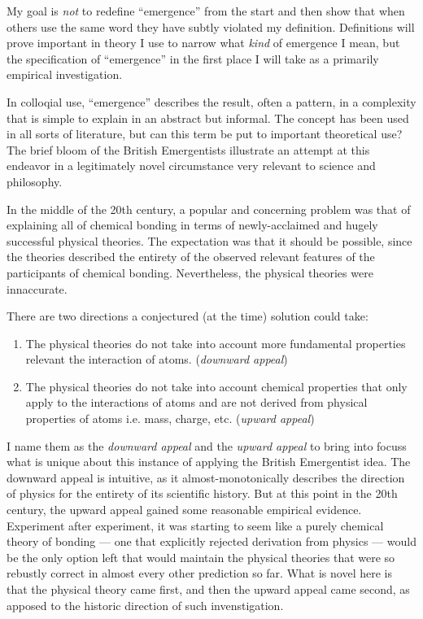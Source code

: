 \documentclass{article}
\newcommand{\ti}[1]{\textit{#1}}
\begin{document}
My goal is \ti{not} to redefine ``emergence'' from the start and then show that when others use the same word they have subtly violated my definition. Definitions will prove important in theory I use to narrow what \ti{kind} of emergence I mean, but the specification of ``emergence'' in the first place I will take as a primarily empirical investigation.


In colloqial use, ``emergence'' describes the result, often a pattern, in a complexity that is simple to explain in an abstract but informal. The concept has been used in all sorts of literature, but can this term be put to important theoretical use? The brief bloom of the British Emergentists illustrate an attempt at this endeavor in a legitimately novel circumstance very relevant to science and philosophy.

In the middle of the 20th century, a popular and concerning problem was that of explaining all of chemical bonding in terms of newly-acclaimed and hugely successful physical theories. The expectation was that it should be possible, since the theories described the entirety of the observed relevant features of the participants of chemical bonding. Nevertheless, the physical theories were innaccurate.

There are two directions a conjectured (at the time) solution could take:
\begin{enumerate}
\item
    The physical theories do not take into account more fundamental properties relevant the interaction of atoms. (\ti{downward appeal})
\item
    The physical theories do not take into account chemical properties that only apply to the interactions of atoms and are not derived from physical properties of atoms i.e. mass, charge, etc. (\ti{upward appeal})
\end{enumerate}

I name them as the \ti{downward appeal} and the \ti{upward appeal} to bring into focuss what is unique about this instance of applying the British Emergentist idea. The downward appeal is intuitive, as it almost-monotonically describes the direction of physics for the entirety of its scientific history. But at this point in the 20th century, the upward appeal gained some reasonable empirical evidence. Experiment after experiment, it was starting to seem like a purely chemical theory of bonding --- one that explicitly rejected derivation from physics --- would be the only option left that would maintain the physical theories that were so rebustly correct in almost every other prediction so far. What is novel here is that the physical theory came first, and then the upward appeal came second, as apposed to the historic direction of such invenstigation.
\end{document}
